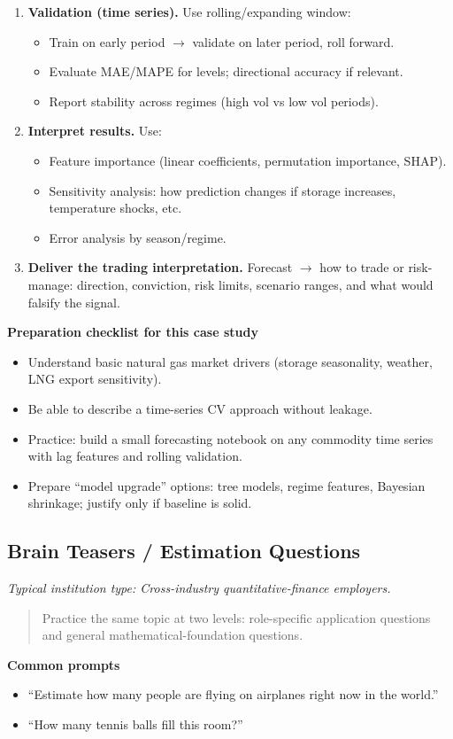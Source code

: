 \documentclass[11pt,letterpaper,openany]{book}
\newcommand{\RoleProfile}[2]{%
  \subsection{#1}%
  \noindent\textit{Typical institution type: #2.}\par
}
\newcommand{\playbooknote}[1]{\begin{quote}\small #1\end{quote}}
\begin{document}
\begin{enumerate}
  \item \textbf{Validation (time series).} Use rolling/expanding window:
  \begin{itemize}
    \item Train on early period $\to$ validate on later period, roll forward.
    \item Evaluate MAE/MAPE for levels; directional accuracy if relevant.
    \item Report stability across regimes (high vol vs low vol periods).
  \end{itemize}

  \item \textbf{Interpret results.} Use:
  \begin{itemize}
    \item Feature importance (linear coefficients, permutation importance, SHAP).
    \item Sensitivity analysis: how prediction changes if storage increases, temperature shocks, etc.
    \item Error analysis by season/regime.
  \end{itemize}

  \item \textbf{Deliver the trading interpretation.} Forecast $\to$ how to trade or risk-manage: direction, conviction, risk limits, scenario ranges, and what would falsify the signal.
\end{enumerate}

\textbf{Preparation checklist for this case study}
\begin{itemize}
  \item Understand basic natural gas market drivers (storage seasonality, weather, LNG export sensitivity).
  \item Be able to describe a time-series CV approach without leakage.
  \item Practice: build a small forecasting notebook on any commodity time series with lag features and rolling validation.
  \item Prepare ``model upgrade'' options: tree models, regime features, Bayesian shrinkage; justify only if baseline is solid.
\end{itemize}

\RoleProfile{Brain Teasers / Estimation Questions}{Cross-industry quantitative-finance employers}
\playbooknote{Practice the same topic at two levels: role-specific application questions and general mathematical-foundation questions.}
\textbf{Common prompts}
\begin{itemize}
  \item ``Estimate how many people are flying on airplanes right now in the world.''
  \item ``How many tennis balls fill this room?''
\end{itemize}
\end{document}
